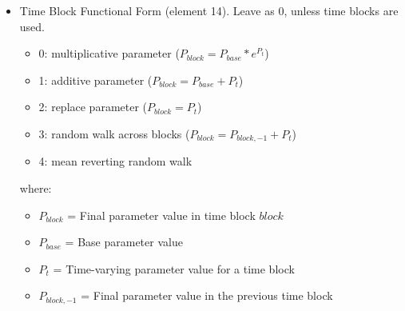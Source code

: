 \begin{itemize}
\item Time Block Functional Form (element 14). Leave as 0, unless time blocks are used.
	\begin{itemize}
		\item 0: multiplicative parameter ($P_{block} = P_{base}*e^{P_t}$)
		\item 1: additive parameter ($P_{block} = P_{base} + P_t$)
		\item 2: replace parameter ($P_{block} = P_t$)
		\item 3: random walk across blocks ($P_{block} = P_{block,-1} + P_t$)
		\item 4: mean reverting random walk
	\end{itemize}
	where:
	\begin{itemize}
        \item $P_{block}$ = Final parameter value in time block $block$
        \item $P_{base}$ = Base parameter value
		\item $P_{t}$ = Time-varying parameter value for a time block
		\item $P_{block,-1}$ = Final parameter value in the previous time block
     \end{itemize}
\end{itemize}





